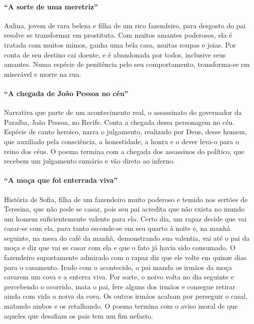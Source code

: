 \paragraph{``A sorte de uma meretriz''}

Aulina, jovem de rara beleza e filha de um rico fazendeiro, para
desgosto do pai resolve se transformar em prostituta. Com muitos
amantes poderosos, ela é tratada com muitos mimos, ganha uma bela casa,
muitas roupas e joias. Por conta de seu destino cai doente, e é
abandonada por todos, inclusive seus amantes. Numa espécie de
penitência pelo seu comportamento, transforma-se em miserável e morre
na rua. 

\paragraph{``A chegada de João Pessoa no céu''}

Narrativa que parte de um acontecimento real, o assassinato do
governador da Paraíba, João Pessoa, no Recife. Conta a chegada dessa
personagem no céu. Espécie de canto heroico, narra o julgamento, realizado por Deus, desse
homem, que auxiliado pela consciência, a
honestidade, a honra e o dever leva-o para o reino dos céus. O poema
termina com a chegada dos assassinos do político, que recebem um
julgamento sumário e vão direto ao inferno. 

\paragraph{``A moça que foi enterrada viva''}

História de Sofia, filha de um fazendeiro muito poderoso e temido nos
sertões de Teresina, que não pode se casar, pois seu pai acredita que
não exista no mundo um homem suficientemente valente para ela. Certo
dia, um rapaz decide que vai casar-se com ela, para tanto esconde-se em
seu quarto à noite e, na manhã seguinte, na mesa do café da manhã,
demonstrando sua valentia, vai até o pai da moça e diz que vai se casar
com ela e que o fato já havia sido consumado. O fazendeiro
supostamente admirado com o rapaz diz que ele volte em quinze dias para o
casamento. Irado com o acontecido, o pai manda os irmãos da moça cavarem
um cova e a enterra viva. Por sorte, o noivo volta no dia seguinte e
percebendo o ocorrido, mata o pai, fere alguns dos irmãos e consegue
retirar ainda com vida a noiva da cova. Os outros irmãos acabam por
perseguir o casal, matando ambos e os retalhando. O poema termina com o
aviso moral de que aqueles que desafiam os pais tem um fim nefasto.

